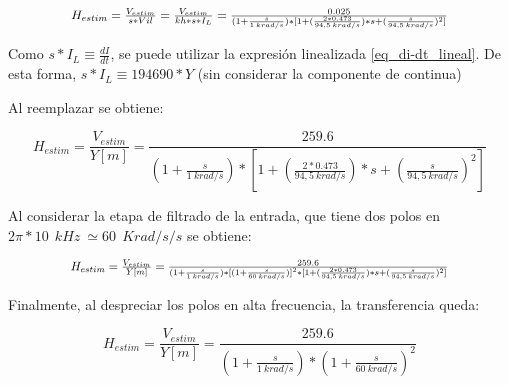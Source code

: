 \begin{equation} \label{eq_TLC_deriv_3}
	\resizebox{.8\hsize}{!}
	{
	$
	H_{estim}=\frac{V_{estim}}{s*Vil}=\frac{V_{estim}}{kh*s*I_L}=\frac{0.025}{(1+\frac{s}{1\: krad/s})*[1+(\frac{2*0.473}{94,5\: krad/s})*s+(\frac{s}{94,5\: krad/s})^2]}
	$
	}
\end{equation}

\noindent Como $s*I_L\equiv \frac{dI}{dt}$, se puede utilizar la expresi\'{o}n linealizada \ref{eq_di-dt_lineal}. De esta forma,  $s*I_L\equiv 194690*Y$ (sin considerar la componente de continua)

\noindent Al reemplazar se obtiene:

\begin{equation} \label{eq_TLC_deriv_5}
	H_{estim}=\frac{V_{estim}}{Y[m]}=\frac{259.6}{(1+\frac{s}{1\ krad/s})*[1+(\frac{2*0.473}{94,5\: krad/s})*s+(\frac{s}{94,5\: krad/s})^2]}
\end{equation}

\noindent Al considerar la etapa de filtrado de la entrada, que tiene dos polos en $2\pi *10\: \:{kHz}\ \simeq 60\: \:{Krad/s}/s$ se obtiene:

\begin{equation} \label{eq_TLC_deriv_6}
	\resizebox{.8\hsize}{!}
	{
		$
	H_{estim}=\frac{V_{estim}}{Y[m]}=\frac{259.6}{(1+\frac{s}{1\: krad/s})*{[(1+\frac{s}{60\: krad/s})]}^2*[1+(\frac{2*0.473}{94,5\: krad/s})*s+(\frac{s}{94,5\: krad/s})^2]}
	$
	}
\end{equation}

\noindent Finalmente, al despreciar los polos en alta frecuencia, la transferencia queda:

\begin{equation} \label{eq_TLC_deriv_7}
	H_{estim}=\frac{V_{estim}}{Y[m]}=\frac{259.6}{(1+\frac{s}{1\: krad/s})*{(1+\frac{s}{60\: krad/s})}^2}
\end{equation}